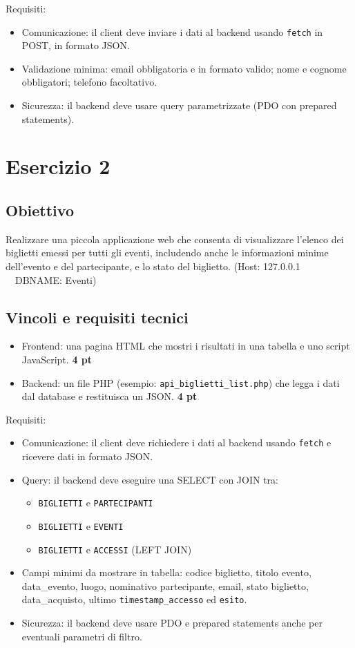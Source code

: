 \documentclass[a4paper,12pt]{article}
\begin{document}
Requisiti: 
\begin{itemize}
	\item Comunicazione: il client deve inviare i dati al backend usando \texttt{fetch} in POST, in formato JSON.
	 \item Validazione minima: email obbligatoria e in formato valido; nome e cognome obbligatori; telefono facoltativo.
	\item Sicurezza: il backend deve usare query parametrizzate (PDO con prepared statements).
\end{itemize}

\section*{Esercizio 2}

\subsection*{Obiettivo}

Realizzare una piccola applicazione web che consenta di visualizzare l'elenco dei
biglietti emessi per tutti gli eventi, includendo anche le informazioni minime
dell'evento e del partecipante, e lo stato del biglietto. (Host: 127.0.0.1 \ \ DBNAME: Eventi)

\subsection*{Vincoli e requisiti tecnici}

\begin{itemize}
	\item Frontend: una pagina HTML che mostri i risultati in una tabella e uno script JavaScript. \textbf{4 pt}
	\item Backend: un file PHP (esempio: \texttt{api\_biglietti\_list.php}) che legga i dati dal database e restituisca un JSON. \textbf{4 pt}
\end{itemize}

Requisiti:
\begin{itemize}
	\item Comunicazione: il client deve richiedere i dati al backend usando \texttt{fetch} e ricevere dati in formato JSON.
	\item Query: il backend deve eseguire una SELECT con JOIN tra:
	\begin{itemize}
		\item \texttt{BIGLIETTI} e \texttt{PARTECIPANTI}
		\item \texttt{BIGLIETTI} e \texttt{EVENTI}
		\item \texttt{BIGLIETTI} e \texttt{ACCESSI} (LEFT JOIN)
	\end{itemize}
	\item Campi minimi da mostrare in tabella: codice biglietto, titolo evento, data\_evento, luogo, nominativo partecipante, email, stato biglietto, data\_acquisto, ultimo \texttt{timestamp\_accesso} ed \texttt{esito}.
	\item Sicurezza: il backend deve usare PDO e prepared statements anche per eventuali parametri di filtro.
\end{itemize}
\end{document}
